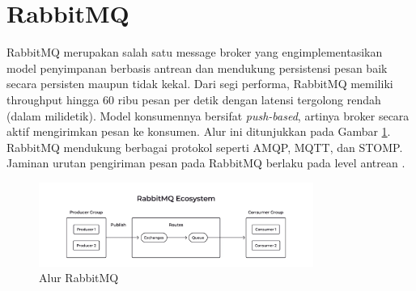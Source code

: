 \section{RabbitMQ}

RabbitMQ merupakan salah satu message broker yang engimplementasikan model penyimpanan berbasis antrean dan mendukung persistensi pesan baik secara persisten maupun tidak kekal. Dari segi performa, RabbitMQ memiliki throughput hingga 60 ribu pesan per detik dengan latensi tergolong rendah (dalam milidetik). Model konsumennya bersifat \textit{push-based}, artinya broker secara aktif mengirimkan pesan ke konsumen. Alur ini ditunjukkan pada Gambar \ref{fig:rabbitmq-flow}. RabbitMQ mendukung berbagai protokol seperti AMQP, MQTT, dan STOMP. Jaminan urutan pengiriman pesan pada RabbitMQ berlaku pada level antrean \parencite{arshadChoosingTheRightMessaging}.

\begin{figure}[htbp]
    \centering
    \includegraphics[width=0.8\textwidth]{resources/chapter-2/rabbitmq.jpeg}
    \caption{Alur RabbitMQ \parencite{royNatsRmqKafka}}
    \label{fig:rabbitmq-flow}
\end{figure}
